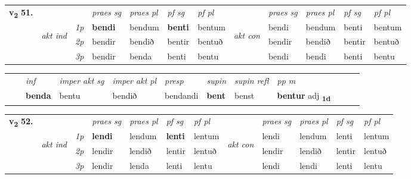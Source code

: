 \begin{tabular}{llllllllllll} \toprule
\multirow{4}{*}{{{\textbf{v{\textsubscript{2}}} \Large{\textbf{51.}}}}}  & &   &  \textit{praes sg}  & \textit{praes pl}  &\textit{ pf sg} & \textit{pf pl} &  &  \textit{praes sg}  & \textit{praes pl}  & \textit{pf sg} & \textit{pf pl } \\*
	\cmidrule{4-7} \cmidrule{9-12}
 & \multirow{3}{*}{\begin{turn}{90}\textit{akt ind}\end{turn}} & {\textit{1p}} & \textbf{bendi} & bendum    & \textbf{benti} & bentum & \multirow{3}{*}{\begin{turn}{90}\textit{akt con}\end{turn}} &bendi & bendum & benti & bentum\\*
& &  {\textit{2p}} &  bendir  & bendið   & bentir & bentuð & & bendir & bendið & bentir & bentuð \\*
& &  {\textit{3p}} & bendir & benda   & benti & bentu & & bendi & bendi& benti & bentu  \\*
\cmidrule{4-7} \cmidrule{9-12}
\end{tabular}


\begin{tabular}{llllllllllll}
 & & \textit{inf} & \textit{imper akt sg} & \textit{imper akt pl}   & \textit{presp} & \textit{supin} & \textit{supin refl} & \textit{pp m}     \\*
  & & \textbf{benda} & bentu  & bendið   & bendandi &  \textbf{bent} & benst & \textbf{bentur} adj \textbf{\textsubscript{1d}} \\*
\cmidrule{1-12}
\end{tabular}



\begin{tabular}{llllllllllll} \toprule
\multirow{4}{*}{{{\textbf{v{\textsubscript{2}}} \Large{\textbf{52.}}}}}  & &   &  \textit{praes sg}  & \textit{praes pl}  &\textit{ pf sg} & \textit{pf pl} &  &  \textit{praes sg}  & \textit{praes pl}  & \textit{pf sg} & \textit{pf pl } \\*
	\cmidrule{4-7} \cmidrule{9-12}
 & \multirow{3}{*}{\begin{turn}{90}\textit{akt ind}\end{turn}} & {\textit{1p}} & \textbf{lendi} & lendum    & \textbf{lenti} & lentum & \multirow{3}{*}{\begin{turn}{90}\textit{akt con}\end{turn}} &lendi & lendum & lenti & lentum\\*
& &  {\textit{2p}} &  lendir  & lendið   & lentir & lentuð & & lendir & lendið & lentir & lentuð \\*
& &  {\textit{3p}} & lendir & lenda   & lenti & lentu & & lendi & lendi& lenti & lentu  \\*
\cmidrule{4-7} \cmidrule{9-12}
\end{tabular}


